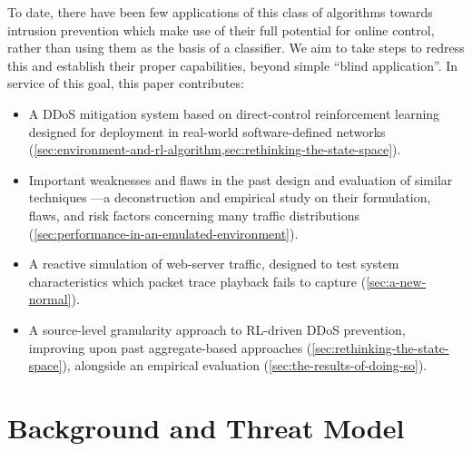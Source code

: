 \documentclass[conference, letterpaper, 10pt, times]{IEEEtran}
\begin{document}
To date, there have been few applications of this class of algorithms towards intrusion prevention which make use of their full potential for online control, rather than using them as the basis of a classifier.
We aim to take steps to redress this and establish their proper capabilities, beyond simple ``blind application''.
In service of this goal, this paper contributes:
\begin{itemize}
	\item A DDoS mitigation system based on direct-control reinforcement learning designed for deployment in real-world software-defined networks (\cref{sec:environment-and-rl-algorithm,sec:rethinking-the-state-space}).
	\item Important weaknesses and flaws in the past design and evaluation of similar techniques \cite{DBLP:journals/eaai/MalialisK15}---a deconstruction and empirical study on their formulation, flaws, and risk factors concerning many traffic distributions (\cref{sec:performance-in-an-emulated-environment}).
	\item A reactive simulation of web-server traffic, designed to test system characteristics which packet trace playback fails to capture (\cref{sec:a-new-normal}).
	\item A source-level granularity approach to RL-driven DDoS prevention, improving upon past aggregate-based approaches (\cref{sec:rethinking-the-state-space}), alongside an empirical evaluation (\cref{sec:the-results-of-doing-so}).
\end{itemize}

\section{Background and Threat Model}
\end{document}
